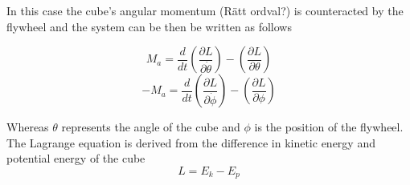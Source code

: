 \documentclass[a4paper,11pt]{kth-mag}
\begin{document}
In this case the cube's angular momentum (Rätt ordval?) is counteracted by the flywheel and the system can be then be written as follows

\begin{equation} \label{eq:positiveL}
M_a=\frac{d}{dt}\left(\frac{\partial L}{\partial \dot{\theta}}\right)-\left(\frac{\partial L}{\partial \theta}\right)
\end{equation}
\begin{equation} \label{eq:negativeL}
-M_a=\frac{d}{dt}\left(\frac{\partial L}{\partial \dot{\phi}}\right)-\left(\frac{\partial L}{\partial \phi}\right)
\end{equation}



Whereas $\theta$ represents the angle of the cube and $\phi$ is the position of the flywheel. \\
The Lagrange equation is derived from the difference in kinetic energy and potential energy of the cube
\begin{equation} \label{eq:Lagrange}
L = E_k - E_p
\end{equation}
\end{document}
